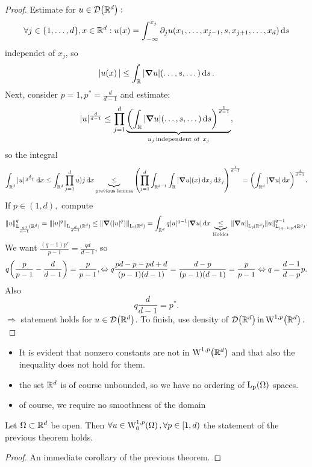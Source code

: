 \documentclass{article}
\begin{document}
\begin{proof}
	Estimate for $u \in \mathcal{D}\qty({\mathbb R}^d):$
	\[
		\forall j \in \{1,\dots,d\}, x \in {\mathbb R}^d: u\qty(x)=\int_{-\infty}^{x_j}\partial_{j}u\qty(x_1,\dots,x_{j-1},s,x_{j+1},\dots,x_d)\dd{s}
	\]
	independet of $x_j$, so
	\[
		|u\qty(x)| \leq \int_{{\mathbb R}}|\grad u|\qty(\dots,s,\dots)\dd{s}.
	\]
	Next, consider $p=1, p^{*}=\frac{d}{d-1}$ and estimate:
	\[
		|u|^{\frac{d}{d-1}}\leq\prod_{j=1}^d\underbrace{\qty(\int_{{\mathbb R}}|\grad u| (\dots, s, \dots) \dd{s})^{\frac{1}{d-1}}}_{u_j \, \text{independent of } \,x_j},
	\]
	so the integral
	\[
		\int_{{\mathbb R}^d}|u|^{\frac{d}{d-1}}\dd{x} \leq \int_{{\mathbb R}^d}\prod_{j=1}^d u)j \dd{x} \underbrace{\leq}_{\text{previous lemma}} \qty(\prod_{j=1}^d \int_{{\mathbb R}^{d-1}}\int_{{\mathbb R}}|\grad u|\qty(x)\dd{x_j}\dd{\hat{x}_j})^{\frac{1}{d-1}} = \qty(\int_{{\mathbb R}^d}|\grad u|\dd{x})^{\frac{d}{d-1}}.
	\]
	If $p \in (1,d),$ compute
	\[
		\norm{u}_{\LpSet[\frac{qd}{d-1}]{\R^d}}^q = \norm{|u|^q}_{\LpSet[\frac{d}{d-1}]{\R^d}} \leq \norm{\grad (|u|^q)}_{\LpSet[1]{\R^d}} = \int_{\R^d}q|u|^{q-1} |\grad u| \dd{x} \underbrace{\leq}_{\, \text{Holder} \,} \norm{\grad u}_{\LpSet[p]{\R^d}} \norm{u}_{\LpSet[(q-1)p']{\R^d}}^{q-1}.
	\] We want $\frac{(q-1)p'}{p-1} = \frac{qd}{d-1}$, so
	\[
		q \qty(\frac{p}{p-1} - \frac{d}{d-1}) = \frac{p}{p-1}, \Leftrightarrow q\frac{pd-p-pd+d}{(p-1)(d-1)}=\frac{d-p}{\qty(p-1)\qty(d-1)}=\frac{p}{p-1} \Leftrightarrow q=\frac{d-1}{d-p}p.
	\]
	Also
	\[
		q \frac{d}{d-1}=p^{*}.
	\]
	$\Rightarrow$ statement holds for $u \in \mathcal{D}\qty({\mathbb R}^d)$. To finish, use density of $\mathcal{D}\qty(\R^d) \, \text{in} \, \WkpSet[1][p]{\R^d}.$
\end{proof}


\begin{remark}

	\begin{itemize}
		\item It is evident that nonzero constants are not in $\WkpSet[1][p]{\R^d}$ and that also the inequality does not hold for them.
		\item the set ${\mathbb R}^d$ is of course unbounded, so we have no ordering of $\LpSet{\Omega}$ spaces.
		\item of course, we require no smoothness of the domain
	\end{itemize}


\end{remark}

\begin{theorem}
	Let $\Omega \subset {\mathbb R}^d$ be open. Then $\forall u \in \WkpzeroSet[1][p]{\Omega}, \forall p \in [1,d)$ the statement of the previous theorem holds.
\end{theorem}
\begin{proof}
	An immediate corollary of the previous theorem.
\end{proof}
\end{document}
